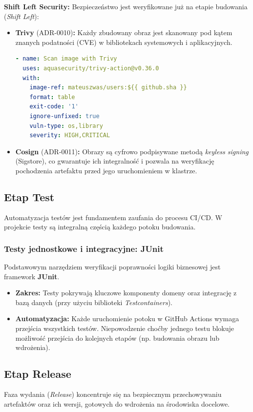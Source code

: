 \textbf{Shift Left Security:}
Bezpieczeństwo jest weryfikowane już na etapie budowania (\textit{Shift Left}):
\begin{itemize}
    \item \textbf{Trivy} (ADR-0010)\textbf{:} Każdy zbudowany obraz jest skanowany pod kątem znanych podatności (CVE) w bibliotekach systemowych i aplikacyjnych.
\begin{lstlisting}[language=yaml, caption={Skanowanie obrazu narz\k{e}dziem Trivy w potoku CI (.github/workflows/ci-users.yml)}, label={lst:trivy-scan}]
- name: Scan image with Trivy
  uses: aquasecurity/trivy-action@v0.36.0
  with:
    image-ref: mateuszwas/users:${{ github.sha }}
    format: table
    exit-code: '1'
    ignore-unfixed: true
    vuln-type: os,library
    severity: HIGH,CRITICAL
\end{lstlisting}
    \item \textbf{Cosign} (ADR-0011)\textbf{:} Obrazy są cyfrowo podpisywane metodą \textit{keyless signing} (Sigstore), co gwarantuje ich integralność i pozwala na weryfikację pochodzenia artefaktu przed jego uruchomieniem w klastrze.
\end{itemize}

\subsection{Etap Test}
Automatyzacja testów jest fundamentem zaufania do procesu CI/CD. W projekcie testy są integralną częścią każdego potoku budowania.

\subsubsection{Testy jednostkowe i integracyjne: JUnit}
Podstawowym narzędziem weryfikacji poprawności logiki biznesowej jest framework \textbf{JUnit}.
\begin{itemize}
    \item \textbf{Zakres:} Testy pokrywają kluczowe komponenty domeny oraz integrację z bazą danych (przy użyciu biblioteki \textit{Testcontainers}).
    \item \textbf{Automatyzacja:} Każde uruchomienie potoku w GitHub Actions wymaga przejścia wszystkich testów. Niepowodzenie choćby jednego testu blokuje możliwość przejścia do kolejnych etapów (np. budowania obrazu lub wdrożenia).
\end{itemize}

\subsection{Etap Release}
Faza wydania (\textit{Release}) koncentruje się na bezpiecznym przechowywaniu artefaktów oraz ich wersji, gotowych do wdrożenia na środowiska docelowe.

